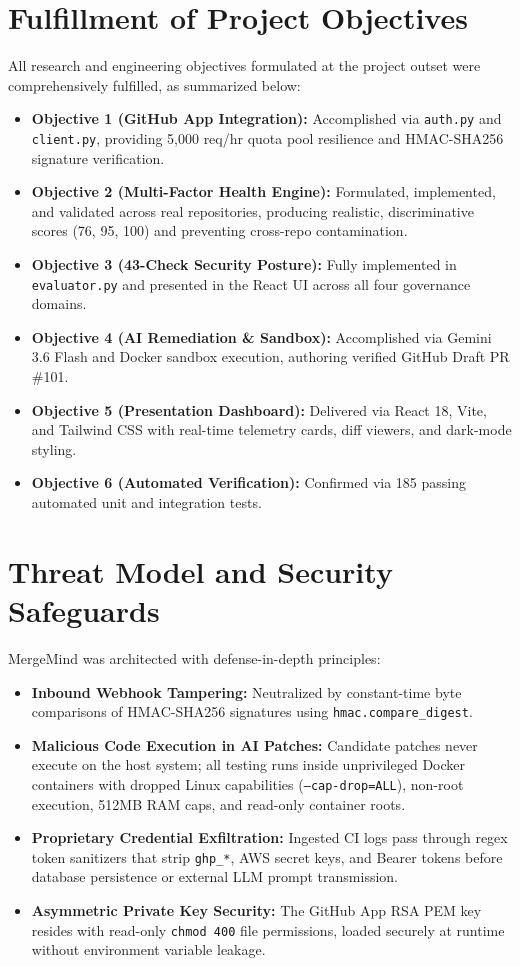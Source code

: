 \section{Fulfillment of Project Objectives}
\label{sec:objective-fulfillment}

All research and engineering objectives formulated at the project outset were comprehensively fulfilled, as summarized below:
\begin{itemize}
    \item \textbf{Objective 1 (GitHub App Integration):} Accomplished via \texttt{auth.py} and \texttt{client.py}, providing 5,000 req/hr quota pool resilience and HMAC-SHA256 signature verification.
    \item \textbf{Objective 2 (Multi-Factor Health Engine):} Formulated, implemented, and validated across real repositories, producing realistic, discriminative scores (76, 95, 100) and preventing cross-repo contamination.
    \item \textbf{Objective 3 (43-Check Security Posture):} Fully implemented in \texttt{evaluator.py} and presented in the React UI across all four governance domains.
    \item \textbf{Objective 4 (AI Remediation \& Sandbox):} Accomplished via Gemini 3.6 Flash and Docker sandbox execution, authoring verified GitHub Draft PR \#101.
    \item \textbf{Objective 5 (Presentation Dashboard):} Delivered via React 18, Vite, and Tailwind CSS with real-time telemetry cards, diff viewers, and dark-mode styling.
    \item \textbf{Objective 6 (Automated Verification):} Confirmed via 185 passing automated unit and integration tests.
\end{itemize}

\section{Threat Model and Security Safeguards}
\label{sec:threat-model}

MergeMind was architected with defense-in-depth principles:
\begin{itemize}
    \item \textbf{Inbound Webhook Tampering:} Neutralized by constant-time byte comparisons of HMAC-SHA256 signatures using \texttt{hmac.compare\_digest}.
    \item \textbf{Malicious Code Execution in AI Patches:} Candidate patches never execute on the host system; all testing runs inside unprivileged Docker containers with dropped Linux capabilities (\texttt{--cap-drop=ALL}), non-root execution, 512MB RAM caps, and read-only container roots.
    \item \textbf{Proprietary Credential Exfiltration:} Ingested CI logs pass through regex token sanitizers that strip \texttt{ghp\_*}, AWS secret keys, and Bearer tokens before database persistence or external LLM prompt transmission.
    \item \textbf{Asymmetric Private Key Security:} The GitHub App RSA PEM key resides with read-only \texttt{chmod 400} file permissions, loaded securely at runtime without environment variable leakage.
\end{itemize}

